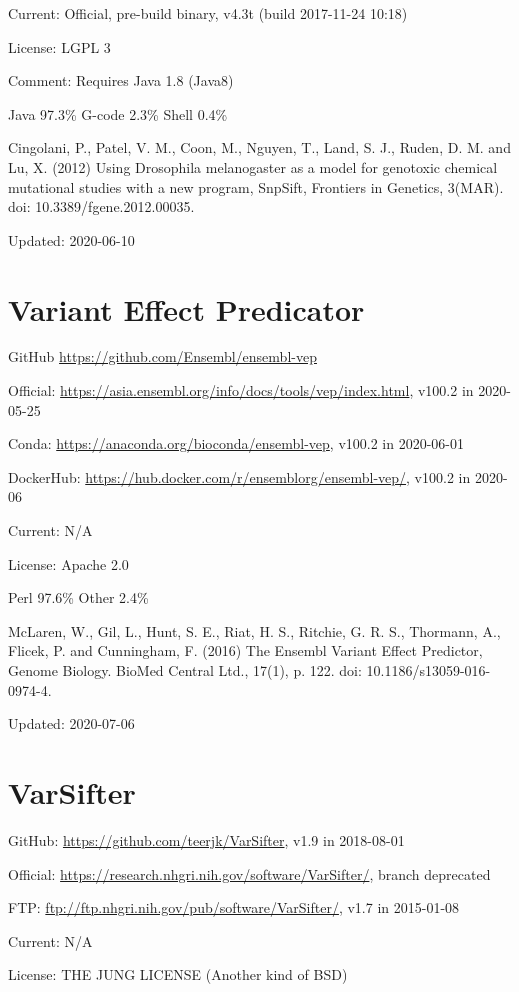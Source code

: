 \documentclass[]{article}
\begin{document}
Current: Official, pre-build binary, v4.3t (build 2017-11-24 10:18)

License: LGPL 3

Comment: Requires Java 1.8 (Java8)

Java 97.3\% G-code 2.3\% Shell 0.4\%

Cingolani, P., Patel, V. M., Coon, M., Nguyen, T., Land, S. J., Ruden, D. M. and Lu, X. (2012) Using Drosophila melanogaster as a model for genotoxic chemical mutational studies with a new program, SnpSift, Frontiers in Genetics, 3(MAR). doi: 10.3389/fgene.2012.00035.

Updated: 2020-06-10


\section{Variant Effect Predicator}

GitHub \url{https://github.com/Ensembl/ensembl-vep}

Official: \url{https://asia.ensembl.org/info/docs/tools/vep/index.html}, v100.2 in 2020-05-25

Conda: \url{https://anaconda.org/bioconda/ensembl-vep}, v100.2 in 2020-06-01

DockerHub: \url{https://hub.docker.com/r/ensemblorg/ensembl-vep/}, v100.2 in 2020-06

Current: N/A

License: Apache 2.0

Perl 97.6\% Other 2.4\%

McLaren, W., Gil, L., Hunt, S. E., Riat, H. S., Ritchie, G. R. S., Thormann, A., Flicek, P. and Cunningham, F. (2016) The Ensembl Variant Effect Predictor, Genome Biology. BioMed Central Ltd., 17(1), p. 122. doi: 10.1186/s13059-016-0974-4.

Updated: 2020-07-06

\section{VarSifter}

GitHub: \url{https://github.com/teerjk/VarSifter}, v1.9 in 2018-08-01

Official: \url{https://research.nhgri.nih.gov/software/VarSifter/}, branch deprecated

FTP: \url{ftp://ftp.nhgri.nih.gov/pub/software/VarSifter/}, v1.7 in 2015-01-08

Current: N/A

License: THE JUNG LICENSE (Another kind of BSD)
\end{document}
